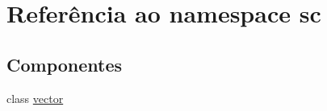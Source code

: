 \hypertarget{namespacesc}{}\section{Referência ao namespace sc}
\label{namespacesc}
\subsection*{Componentes}
\begin{DoxyCompactItemize}
\item 
class \mbox{\hyperlink{classsc_1_1vector}{vector}}
\end{DoxyCompactItemize}
